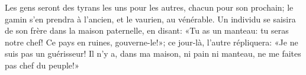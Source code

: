 Les gens seront des tyrans les uns pour les autres, chacun pour son prochain;
	le gamin s’en prendra à l’ancien, et le vaurien, au vénérable.
Un individu se saisira de son frère dans la maison paternelle, en disant:
	«Tu as un manteau: tu seras notre chef!
	Ce pays en ruines, gouverne-le!»;
ce jour-là, l’autre répliquera:
	«Je ne suis pas un guérisseur!
	Il n’y a, dans ma maison, ni pain ni manteau, ne me faites pas chef du peuple!»
